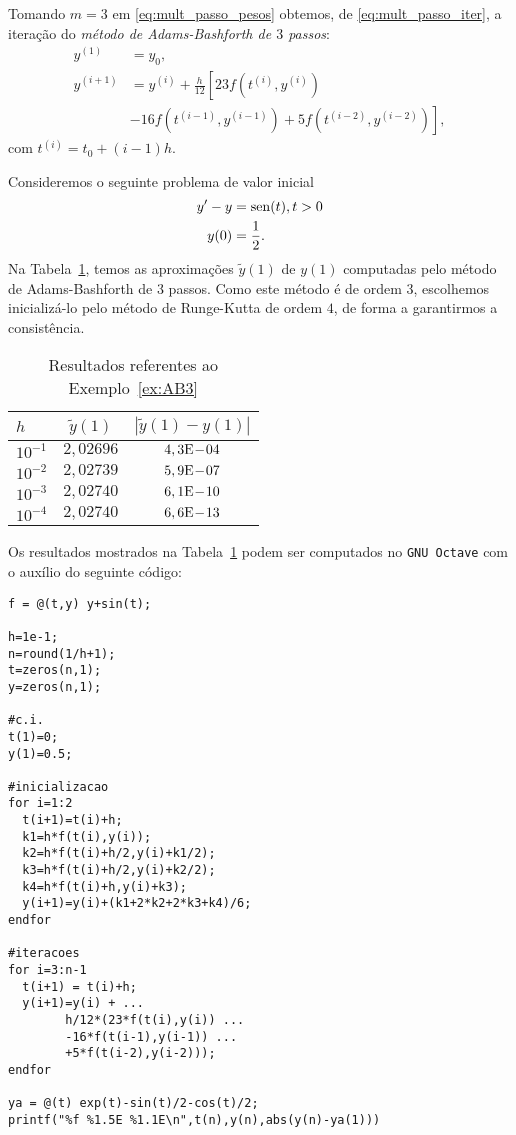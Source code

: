 Tomando $m=3$ em \eqref{eq:mult_passo_pesos} obtemos, de \eqref{eq:mult_passo_iter}, a iteração do \emph{método de Adams-Bashforth de $3$ passos}:
\begin{align}
  y^{(1)} &= y_0,\\
  y^{(i+1)} &= y^{(i)} + \frac{h}{12}\left[23f(t^{(i)},y^{(i)}) \right.\nonumber\\
              &\left. - 16f(t^{(i-1)},y^{(i-1)}) + 5f(t^{(i-2)},y^{(i-2)})\right],
\end{align}
com $t^{(i)} = t_0 + (i-1)h$.

\begin{ex}\label{ex:AB3}
  Consideremos o seguinte problema de valor inicial
  \begin{align}
    y' - y &= \operatorname{sen}(t), t>0\\
    y(0) &= \frac{1}{2}.
  \end{align}
  Na Tabela~\ref{tab:ex_AB3}, temos as aproximações $\tilde{y}(1)$ de $y(1)$ computadas pelo método de Adams-Bashforth de $3$ passos. Como este método é de ordem $3$, escolhemos inicializá-lo pelo método de Runge-Kutta de ordem $4$, de forma a garantirmos a consistência.
 
  \begin{table}[h!]
    \centering
    \begin{tabular}{l|cc}
      $h$ & $\tilde{y}(1)$ & $|\tilde{y}(1)-y(1)|$\\\hline
      $10^{-1}$ & $2,02696$ & $4,3\mathrm{E}\!-\!04$ \\
      $10^{-2}$ & $2,02739$ & $5,9\mathrm{E}\!-\!07$ \\
      $10^{-3}$ & $2,02740$ & $6,1\mathrm{E}\!-\!10$ \\
      $10^{-4}$ & $2,02740$ & $6,6\mathrm{E}\!-\!13$ \\\hline
   \end{tabular}
    \caption{Resultados referentes ao Exemplo~\ref{ex:AB3}}
    \label{tab:ex_AB3}
  \end{table}

\ifisoctave
Os resultados mostrados na Tabela~\ref{tab:ex_AB3} podem ser computados no \verb+GNU Octave+ com o auxílio do seguinte código:
\begin{verbatim}
f = @(t,y) y+sin(t);

h=1e-1;
n=round(1/h+1);
t=zeros(n,1);
y=zeros(n,1);

#c.i.
t(1)=0;
y(1)=0.5;

#inicializacao
for i=1:2
  t(i+1)=t(i)+h;
  k1=h*f(t(i),y(i));
  k2=h*f(t(i)+h/2,y(i)+k1/2);
  k3=h*f(t(i)+h/2,y(i)+k2/2);
  k4=h*f(t(i)+h,y(i)+k3);
  y(i+1)=y(i)+(k1+2*k2+2*k3+k4)/6;
endfor

#iteracoes
for i=3:n-1
  t(i+1) = t(i)+h;
  y(i+1)=y(i) + ...
        h/12*(23*f(t(i),y(i)) ...
        -16*f(t(i-1),y(i-1)) ...
        +5*f(t(i-2),y(i-2)));
endfor

ya = @(t) exp(t)-sin(t)/2-cos(t)/2;
printf("%f %1.5E %1.1E\n",t(n),y(n),abs(y(n)-ya(1)))
\end{verbatim}
\fi
\end{ex}


